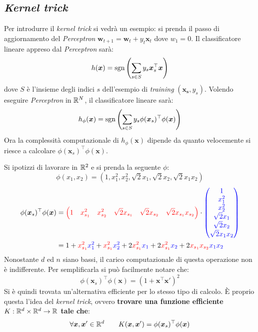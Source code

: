 \subsection{\textit{Kernel trick}}
Per introdurre il \textit{kernel trick} si vedrà un esempio: si prenda il
passo di aggiornamento del \textit{Perceptron} 
$\bm{w}_{t+1}=\bm{w}_t+y_t\bm{x}_t$ dove $w_1=0$. Il classificatore lineare
appreso dal \textit{Perceptron} sarà:
$$ h(\bm{x}) = \operatorname*{sgn}{\left(\sum_{s\in S} y_s\bm{x}_s^\top \bm{x}\right)} $$
dove $S$ è l'insieme degli indici $s$ dell'esempio di \textit{training}
$(\bm{x_s},y_s)$.
Volendo eseguire \textit{Perceptron} in $\mathbb{R}^N$, il classificatore lineare
sarà:
$$h_\phi(\bm{x}) 
= \operatorname*{sgn}{\left(\sum_{s\in S} y_s\phi(\bm{x}_s)^\top\phi(\bm{x})\right)} $$
Ora la complessità computazionale di $h_\phi(\bm{x})$ dipende da quanto
velocemente si riesce a calcolare $\phi(\bm{x}_s)^\top\phi(\bm{x})$. 

Si ipotizzi di lavorare in $\mathbb{R}^2$ e si prenda la seguente $\phi$:
$$ \phi(x_1,x_2)=(1,x_1^2,x_2^2,\sqrt{2}x_1,\sqrt{2}x_2,\sqrt{2}x_1x_2) $$
$$
\begin{aligned} \phi(\bm{x}_s)^\top\phi(\bm{x}) &= 
{\color{red}
\left(1\quad x_{s_1}^2\quad x_{s_2}^2\quad \sqrt{2}x_{s_1}\quad \sqrt{2}x_{s_2}\quad
\sqrt{2}x_{s_1}x_{s_2}\right)}\cdot {\color{blue}
\begin{pmatrix}1\\x_1^2\\x_2^2\\\sqrt{2}x_1\\\sqrt{2}x_2\\\sqrt{2}x_1x_2\end{pmatrix}}\\
&= 1+{\color{red}x_{s_1}^2}{\color{blue}x_1^2}+{\color{red}x_{s_1}^2}{\color{blue}x_2^2}
+2{\color{red}x_{s_1}^2}{\color{blue}x_1}+2{\color{red}x_{s_1}^2}{\color{blue}x_2}
+2{\color{red}x_{s_1}x_{s_2}}{\color{blue}x_1x_2}
\end{aligned}
$$
Nonostante $d$ ed $n$ siano bassi, il carico computazionale di questa
operazione non è indifferente. Per semplificarla si può facilmente
notare che:
\begin{equation}\label{eq:kernel_quad}
    \phi(\bm{x}_s)^\top\phi(\bm{x}) = (1+\bm{x}^\top\bm{x}')^2
\end{equation}
Si è quindi trovata un'alternativa efficiente per lo stesso tipo di calcolo.
È proprio questa l'idea del \textit{kernel trick}, ovvero \textbf{trovare
una funzione efficiente $K:\mathbb{R}^d\times\mathbb{R}^d\rightarrow\mathbb{R}$ tale che}:
$$\forall \bm{x},\bm{x}'\in\mathbb{R}^d \qquad
K(\bm{x},\bm{x}') = \phi(\bm{x}_s)^\top\phi(\bm{x}) $$

